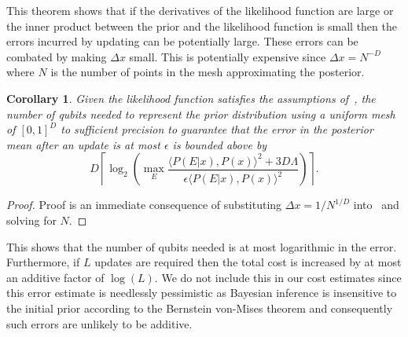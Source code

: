 \documentclass[aps,amsmath,onecolumn,amssymb]{revtex4}
\newtheorem{corollary}{Corollary}
\begin{document}
This theorem shows that if the derivatives of the likelihood function are large or the inner product between the prior and the likelihood function is small then the errors incurred by updating can be potentially large.  These errors can be combated by making $\Delta x$ small.  This is potentially expensive since $\Delta x = N^{-D}$ where $N$ is the number of points in the mesh approximating the posterior.

\begin{corollary}
Given the likelihood function satisfies the assumptions of~, the number of qubits needed to represent the prior distribution using a uniform mesh of $[0,1]^D$ to sufficient precision to guarantee that the error in the posterior mean after an update is at most $\epsilon$ is bounded above by
$$
D \left\lceil\log_2\left(\max_E \frac{\langle P(E|x),P(x)\rangle^2+3{D} \Lambda}{\epsilon \langle P(E|x),P(x)\rangle^2}
\right) \right\rceil.
$$
\end{corollary}
\begin{proof}
Proof is an immediate consequence of substituting $\Delta x =1/N^{1/D}$ into~ and solving for $N$.
\end{proof}
This shows that the number of qubits needed is at most logarithmic in the error.  Furthermore, if $L$ updates are required then the total cost is increased by at most an additive factor of $\log(L)$.  We do not include this in our cost estimates since this error estimate is needlessly pessimistic as Bayesian inference is insensitive to the initial prior according to the Bernstein von-Mises theorem and consequently such errors are unlikely to be additive.
\end{document}
